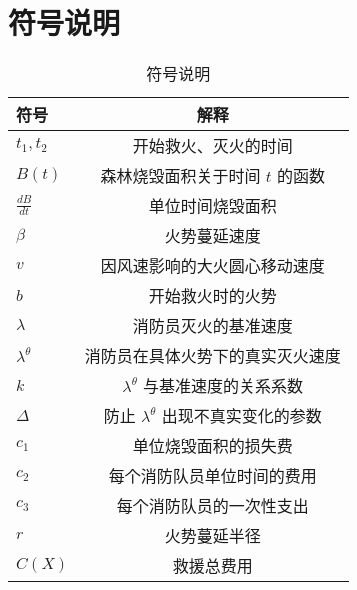 \section{符号说明}\label{sec:Notation}

\begin{table}[H]
    \centering
    \caption{符号说明}
    \label{tab:fire_symbols}
    \begin{tabular}{lc}
        \toprule
        符号 & 解释 \\
        \midrule
        $t_1, t_2$        & 开始救火、灭火的时间 \\
        $B(t)$            & 森林烧毁面积关于时间 $t$ 的函数 \\
        $\frac{dB}{dt}$   & 单位时间烧毁面积 \\
        $\beta$           & 火势蔓延速度 \\
        $v$               & 因风速影响的大火圆心移动速度 \\
        $b$               & 开始救火时的火势 \\
        $\lambda$         & 消防员灭火的基准速度 \\
        $\lambda^{\theta}$& 消防员在具体火势下的真实灭火速度 \\
        $k$               & $\lambda^{\theta}$ 与基准速度的关系系数 \\
        $\Delta$          & 防止 $\lambda^{\theta}$ 出现不真实变化的参数 \\
        $c_1$             & 单位烧毁面积的损失费 \\
        $c_2$             & 每个消防队员单位时间的费用 \\
        $c_3$             & 每个消防队员的一次性支出 \\
        $r$               & 火势蔓延半径 \\
        $C(X)$            & 救援总费用 \\
        \bottomrule
    \end{tabular}
\end{table}
